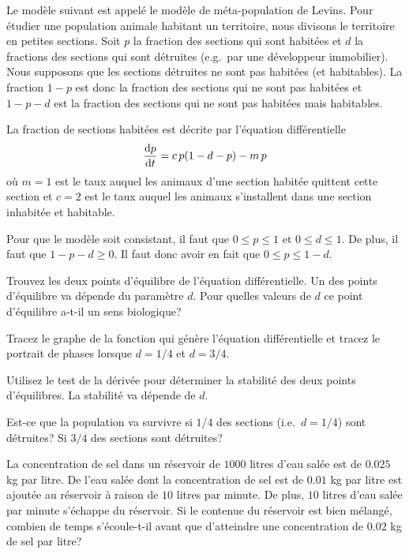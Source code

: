 \begin{question}[\life]
Le modèle suivant est appelé le modèle de méta-population de Levins.
Pour étudier une population animale habitant un territoire, nous divisons le
territoire en petites sections.  Soit $p$ la fraction des sections qui sont
habitées et $d$ la fractions des sections qui sont détruites (e.g.\ par une
développeur immobilier).  Nous supposons que les sections détruites ne sont pas
habitées (et habitables).  La fraction $1-p$ est donc la fraction des
sections qui ne sont pas habitées et $1-p-d$ est la fraction des sections qui
ne sont pas habitées mais habitables.

La fraction de sections habitées est décrite par l'équation différentielle
\[
\frac{\mathrm{d}p}{\mathrm{d}t} = c\,p(1-d-p)-m \,p
\]
où $m=1$ est le taux auquel les animaux d'une section habitée quittent cette
section et $c=2$ est le taux auquel les animaux s'installent dans une section
inhabitée et habitable.

Pour que le modèle soit consistant, il faut que $0\leq p \leq 1$ et
$0 \leq d \leq 1$.  De plus, il faut que $1 - p - d \geq 0$.
Il faut donc avoir en fait que $0 \leq p \leq 1 - d$.

 Trouvez les deux points d'équilibre de l'équation différentielle.
Un des points d'équilibre va dépende du paramètre $d$.  Pour quelles valeurs
de $d$ ce point d'équilibre a-t-il un sens biologique?

 Tracez le graphe de la fonction qui génère l'équation différentielle
et tracez le portrait de phases lorsque $d=1/4$ et $d=3/4.$

 Utilisez le test de la dérivée pour déterminer la stabilité des
deux points d'équilibres.  La stabilité va dépende de $d$.

 Est-ce que la population va survivre si $1/4$ des sections
(i.e.\ $d=1/4$) sont détruites?  Si $3/4$ des sections sont détruites?
\label{10Q52}
\end{question}

\begin{question}[\eng]
La concentration de sel dans un réservoir de $1000$ litres d'eau salée
est de $0.025$ kg par litre.  De l'eau salée dont la concentration de
sel est de $0.01$ kg par litre est ajoutée au réservoir à raison de
$10$ litres par minute.  De plus, $10$ litres d'eau salée par minute
s'échappe du réservoir.  Si le contenue du réservoir
est bien mélangé, combien de temps s'écoule-t-il avant que d'atteindre
une concentration de $0.02$ kg de sel par litre?
\label{10Q53}
\end{question}

